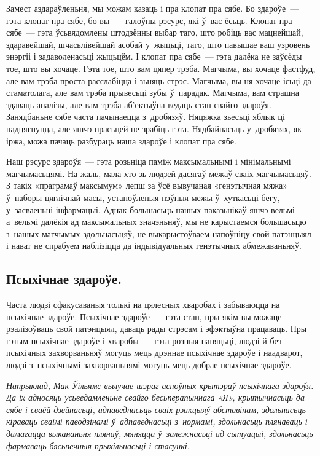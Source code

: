 
Замест аздараўленьня, мы можам казаць і пра клопат пра сябе. Бо здароўе~--- гэта клопат пра сябе, бо вы~--- галоўны рэсурс, які ў~вас ёсьць. Клопат пра сябе~--- гэта ўсьвядомлены штодзённы выбар таго, што робіць вас мацнейшай, здаравейшай, шчасьлівейшай асобай у~жыцьці, таго, што павышае ваш узровень энэргіі і задаволенасьці жыцьцём. І клопат пра сябе~--- гэта далёка не заўсёды тое, што вы хочаце. Гэта тое, што вам цяпер трэба. Магчыма, вы хочаце фастфуд, але вам трэба проста расслабіцца і зьняць стрэс. Магчыма, вы ня хочаце ісьці да стаматолага, але вам трэба прывесьці зубы ў~парадак. Магчыма, вам страшна здаваць аналізы, але вам трэба аб'ектыўна ведаць стан свайго здароўя. Занядбаньне сябе часта пачынаецца з~дробязяў. Няцяжка зьесьці яблык ці падцягнуцца, але яшчэ прасьцей не зрабіць гэта. Нядбайнасьць у~дробязях, як іржа, можа пачаць разбураць наша здароўе і клопат пра сябе.

Наш рэсурс здароўя~--- гэта розьніца паміж максымальнымі і мінімальнымі магчымасьцямі. На жаль, мала хто зь людзей дасягаў межаў сваіх магчымасьцяў. З такіх «праграмаў максымум» лепш за ўсё вывучаная «генэтычная мяжа» ў~наборы цяглічнай масы, устаноўленыя пэўныя межы ў~хуткасьці бегу, у~засваеньні інфармацыі. Аднак большасьць нашых паказьнікаў яшчэ вельмі а~вельмі далёкія ад максымальных значэньняў, мы не карыстаемся большасьцю з~нашых магчымых здольнасьцяў, не выкарыстоўваем напоўніцу свой патэнцыял і нават не спрабуем наблізіцца да індывідуальных генэтычных абмежаваньняў.

\subsection*{Псыхічнае здароўе.}

Часта людзі сфакусаваныя толькі на цялесных хваробах і забываюцца на псыхічнае здароўе. Псыхічнае здароўе~--- гэта стан, пры якім вы можаце рэалізоўваць свой патэнцыял, даваць рады стрэсам і эфэктыўна працаваць. Пры гэтым псыхічнае здароўе і хваробы~--- гэта розныя паняцьці, людзі й без псыхічных захворваньняў могуць мець дрэннае псыхічнае здароўе і наадварот, людзі з~псыхічнымі захворваньнямі могуць мець добрае псыхічнае здароўе.

\emph{Напрыклад, Мак-Ўільямс вылучае шэраг асноўных крытэраў псыхічнага здароўя. Да іх адносяць усьведамленьне свайго бесьперапыннага «Я», крытычнасьць да сябе і сваёй дзейнасьці, адпаведнасьць сваіх рэакцыяў абставінам, здольнасьць кіраваць сваімі паводзінамі ў~адпаведнасьці з~нормамі, здольнасьць плянаваць і дамагацца выкананьня плянаў, мяняцца ў~залежнасьці ад сытуацыі, здольнасьць фармаваць бясьпечныя прыхільнасьці і стасункі.}


